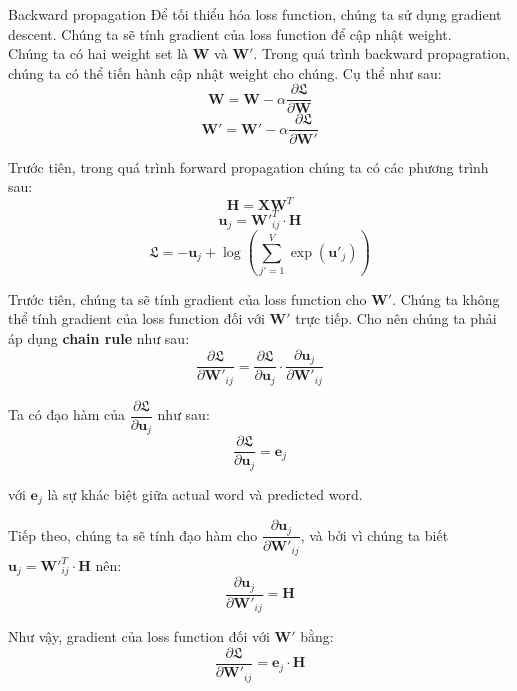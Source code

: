 \documentclass[12pt]{article}
\makeatletter
\renewcommand\paragraph{\@startsection{paragraph}{4}{\z@}
            {-2.5ex\@plus -1ex \@minus -.25ex}
            {1.25ex \@plus .25ex}
            {\normalfont\normalsize\bfseries}}
\newcommand{\twiceIndent}{\hspace{\parindent}}
\makeatother
\begin{document}
\paragraph{Backward propagation}
Để tối thiểu hóa loss function, chúng ta sử dụng gradient descent. Chúng ta sẽ tính gradient của loss function để cập nhật weight.\\

\indent Chúng ta có hai weight set là $\boldsymbol{W}$ và $\boldsymbol{W'}$. Trong quá trình backward propagration, chúng ta có thể tiến hành cập nhật weight cho chúng. Cụ thể như sau:
$$\boldsymbol{W} = \boldsymbol{W} - \alpha \dfrac{\partial \mathfrak{L}}{\partial \boldsymbol{W}}$$ 
$$\boldsymbol{W'} = \boldsymbol{W'} - \alpha \dfrac{\partial \mathfrak{L}}{\partial \boldsymbol{W'}}$$ 

\indent Trước tiên, trong quá trình forward propagation chúng ta có các phương trình sau:
$$\boldsymbol{H} = \boldsymbol{XW}^T$$
$$\boldsymbol{u}_j = \boldsymbol{W'}_{ij}^T \cdot \boldsymbol{H}$$
$$\mathfrak{L} = -\boldsymbol{u}_j + \log{\left ( \sum_{j'=1}^V \exp{(\boldsymbol{u'}_j)} \right )}$$

\indent Trước tiên, chúng ta sẽ tính gradient của loss function cho $\boldsymbol{W'}$. Chúng ta không thể tính gradient của loss function đối với $\boldsymbol{W'}$ trực tiếp. Cho nên chúng ta phải áp dụng \textbf{chain rule} như sau:
$$\dfrac{\partial \mathfrak{L}}{\partial \boldsymbol{W'}_{ij}} = \dfrac{\partial \mathfrak{L}}{\partial \boldsymbol{u}_j} \cdot \dfrac{\partial \boldsymbol{u}_j}{\partial \boldsymbol{W'}_{ij}}$$

\indent Ta có đạo hàm của $\dfrac{\partial \mathfrak{L}}{\partial \boldsymbol{u}_j}$ như sau:
\begin{equation}
  \dfrac{\partial \mathfrak{L}}{\partial \boldsymbol{u}_j} = \boldsymbol{e}_j
\end{equation}

\twiceIndent với $\boldsymbol{e}_j$ là sự khác biệt giữa actual word và predicted word.

\vskip 0.5cm
\indent Tiếp theo, chúng ta sẽ tính đạo hàm cho $\dfrac{\partial \boldsymbol{u}_j}{\partial \boldsymbol{W'}_{ij}}$, và bởi vì chúng ta biết $\boldsymbol{u}_j = \boldsymbol{W'}_{ij}^T \cdot \boldsymbol{H}$ nên:
$$\dfrac{\partial \boldsymbol{u}_j}{\partial \boldsymbol{W'}_{ij}} = \boldsymbol{H}$$

\indent Như vậy, gradient của loss function đối với $\boldsymbol{W'}$ bằng:
$$\dfrac{\partial \mathfrak{L}}{\partial \boldsymbol{W'}_{ij}} = \boldsymbol{e}_j \cdot \boldsymbol{H}$$
\end{document}
